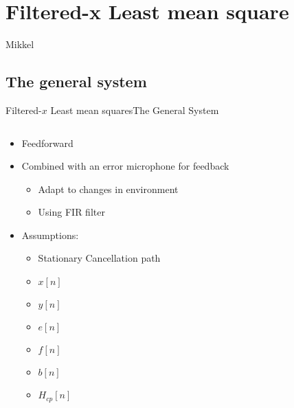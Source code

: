 \section{Filtered-x Least mean square}

\begin{frame}{Mikkel}
	  \tableofcontents[
	  sectionstyle=show/show/shaded,
	  subsectionstyle=show/show/show
	  ]
\end{frame}
\subsection{The general system}
\begin{frame}{Filtered-$x$ Least mean squares}{The General System}
	\begin{columns}
		\begin{column}{0.5\textwidth}		

		\begin{itemize}
		\item Feedforward
		\item Combined with an error microphone for feedback
		\begin{itemize}
		\item Adapt to changes in environment
		\item Using FIR filter		
		\end{itemize}
		\item Assumptions:
		\begin{itemize}
		\item Stationary Cancellation path
		\end{itemize}

		\begin{itemize}
			\setlength{\itemindent}{4em}
			\item[Input] $x[n]$
			\item[Output]$y[n]$
			\item[Error] $e[n]$	
			\item[Filtered x] $f[n]$
			\item[Filter coefficients] $b[n]$	
			\item[Cancellation Path] $H_{cp}[n]$		
		\end{itemize}

		\end{itemize}

		
		\end{column}
		\begin{column}{0.5\textwidth}
		\resizebox{1.1\columnwidth}{!}{	
		
		}
		\end{column}
	\end{columns}
\end{frame}


